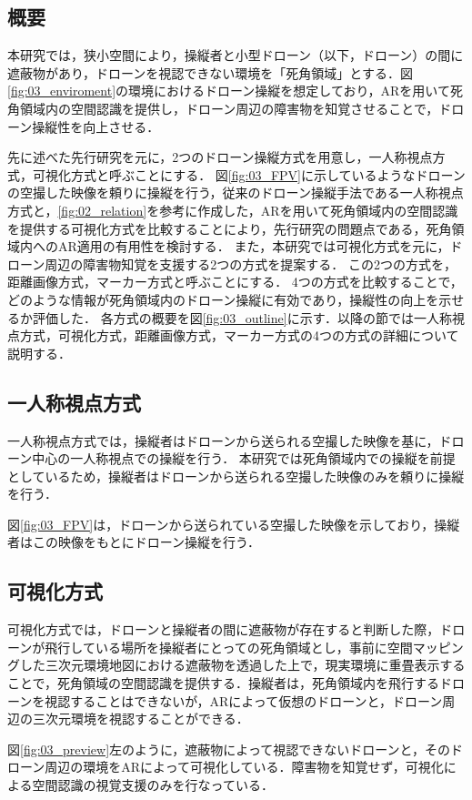 \documentclass[submit,techrep]{ipsj}
\begin{document}
\subsection{概要}
本研究では，狭小空間により，操縦者と小型ドローン（以下，ドローン）の間に遮蔽物があり，ドローンを視認できない環境を「死角領域」とする．図\ref{fig:03_enviroment}の環境におけるドローン操縦を想定しており，ARを用いて死角領域内の空間認識を提供し，ドローン周辺の障害物を知覚させることで，ドローン操縦性を向上させる．
\par
先に述べた先行研究\cite{Erat}を元に，2つのドローン操縦方式を用意し，一人称視点方式，可視化方式と呼ぶことにする．
図\ref{fig:03_FPV}に示しているようなドローンの空撮した映像を頼りに操縦を行う，従来のドローン操縦手法である一人称視点方式と，\ref{fig:02_relation}を参考に作成した，ARを用いて死角領域内の空間認識を提供する可視化方式を比較することにより，先行研究の問題点である，死角領域内へのAR適用の有用性を検討する．
また，本研究では可視化方式を元に，ドローン周辺の障害物知覚を支援する2つの方式を提案する．
この2つの方式を，距離画像方式，マーカー方式と呼ぶことにする．
4つの方式を比較することで，どのような情報が死角領域内のドローン操縦に有効であり，操縦性の向上を示せるか評価した．
各方式の概要を図\ref{fig:03_outline}に示す．以降の節では一人称視点方式，可視化方式，距離画像方式，マーカー方式の4つの方式の詳細について説明する．


\subsection{一人称視点方式}
一人称視点方式では，操縦者はドローンから送られる空撮した映像を基に，ドローン中心の一人称視点での操縦を行う．
本研究では死角領域内での操縦を前提としているため，操縦者はドローンから送られる空撮した映像のみを頼りに操縦を行う．
\par
図\ref{fig:03_FPV}は，ドローンから送られている空撮した映像を示しており，操縦者はこの映像をもとにドローン操縦を行う．


\subsection{可視化方式}
可視化方式では，ドローンと操縦者の間に遮蔽物が存在すると判断した際，ドローンが飛行している場所を操縦者にとっての死角領域とし，事前に空間マッピングした三次元環境地図における遮蔽物を透過した上で，現実環境に重畳表示することで，死角領域の空間認識を提供する．操縦者は，死角領域内を飛行するドローンを視認することはできないが，ARによって仮想のドローンと，ドローン周辺の三次元環境を視認することができる．
\par
図\ref{fig:03_preview}左のように，遮蔽物によって視認できないドローンと，そのドローン周辺の環境をARによって可視化している．障害物を知覚せず，可視化による空間認識の視覚支援のみを行なっている．
\end{document}
